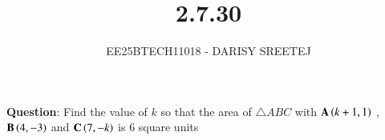\documentclass[journal]{IEEEtran}
\begin{document}

\vspace{3cm}

\title{2.7.30}
\author{EE25BTECH11018 - DARISY SREETEJ}
{\let\newpage\relax\maketitle}

\renewcommand{\thefigure}{\theenumi}
\renewcommand{\thetable}{\theenumi}
\setlength{\intextsep}{10pt} %


\renewcommand{\thetable}{\theenumi}


\textbf{Question}:
 Find the value of $k$ so that the area of $\triangle$$ABC$ with $\mathbf{A}\left(k+1,1\right)$ , $\mathbf{B}\left(4,-3\right)$ and $\mathbf{C}\left(7, -k\right)$ is $6$ square units

\quad
\end{document}
